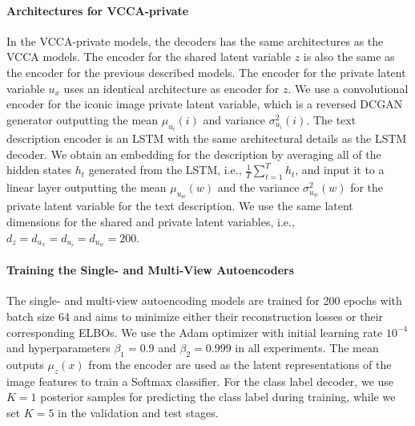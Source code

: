 \paragraph{Architectures for VCCA-private} In the VCCA-private models, the decoders has the same architectures as the VCCA models. The encoder for the shared latent variable $z$ is also the same as the encoder for the previous described models. The encoder for the private latent variable $u_{x}$ uses an identical architecture as encoder for $z$. We use a convolutional encoder for the iconic image private latent variable, which is a reversed DCGAN generator outputting the mean $\mu_{u_{i}}(i)$ and variance ${\sigma}_{u_{i}}^2(i)$. The text description encoder is an LSTM with the same architectural details as the LSTM decoder. We obtain an embedding for the description by averaging all of the hidden states $h_t$ generated from the LSTM, i.e., $\frac{1}{T} \sum_{t=1}^{T} h_t$, and input it to a linear layer outputting the mean $\mu_{u_{w}}(w)$ and the variance ${\sigma}_{u_{w}}^2(w)$ for the private latent variable for the text description. We use the same latent dimensions for the shared and private latent variables, i.e., $d_{z} = d_{u_{x}} = d_{u_{i}} = d_{u_{w}} = 200$. 


\paragraph{Training the Single- and Multi-View Autoencoders} The single- and multi-view autoencoding models are trained for 200 epochs with batch size 64 and aims to minimize either their reconstruction losses or their corresponding ELBOs. We use the Adam optimizer with initial learning rate $10^{-4}$ and hyperparameters $\beta_1 = 0.9$ and $\beta_2 = 0.999$ in all experiments. The mean outputs $\mu_{z}(x)$ from the encoder are used as the latent representations of the image features to train a Softmax classifier. For the class label decoder, we use $K=1$ posterior samples for predicting the class label during training, while we set $K=5$ in the validation and test stages. 


